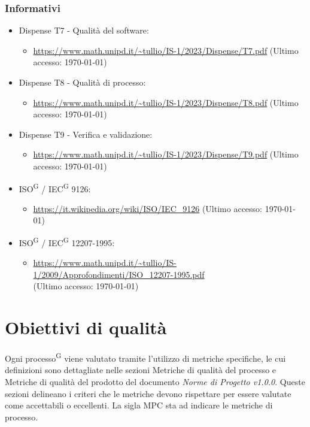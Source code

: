 \documentclass[8pt]{article}
\newcommand{\glossterm}[1]{#1\textsuperscript{G}} %
\begin{document}
\subsubsection{Informativi}
\begin{itemize}
	\item Dispense T7 - Qualità del software:
	\begin{itemize}
		\item \href{https://www.math.unipd.it/~tullio/IS-1/2023/Dispense/T7.pdf}{\color{myblue}https://www.math.unipd.it/\textasciitilde{}tullio/IS-1/2023/Dispense/T7.pdf} (Ultimo accesso: \today)
	\end{itemize}
	\item Dispense T8 - Qualità di processo:
	\begin{itemize}
		\item \href{https://www.math.unipd.it/~tullio/IS-1/2023/Dispense/T8.pdf}{\color{myblue}https://www.math.unipd.it/\textasciitilde{}tullio/IS-1/2023/Dispense/T8.pdf} (Ultimo accesso: \today)
	\end{itemize}
	\item Dispense T9 - Verifica e validazione:
	\begin{itemize}
		\item \href{https://www.math.unipd.it/~tullio/IS-1/2023/Dispense/T9.pdf}{\color{myblue}https://www.math.unipd.it/\textasciitilde{}tullio/IS-1/2023/Dispense/T9.pdf} (Ultimo accesso: \today)
	\end{itemize}
	\item \glossterm{ISO} / \glossterm{IEC} 9126:
	\begin{itemize}
		\item \href{https://it.wikipedia.org/wiki/ISO/IEC_9126}{\color{myblue}https://it.wikipedia.org/wiki/ISO/IEC\_9126} (Ultimo accesso: \today)
	\end{itemize}
	\item \glossterm{ISO} / \glossterm{IEC} 12207-1995:
	\begin{itemize}
		\item \href{https://www.math.unipd.it/~tullio/IS-1/2009/Approfondimenti/ISO_12207-1995.pdf}{\color{myblue}https://www.math.unipd.it/\textasciitilde{}tullio/IS-1/2009/Approfondimenti/ISO\_12207-1995.pdf} \\ (Ultimo accesso: \today)
	\end{itemize}
\end{itemize}
\clearpage
\section{Obiettivi di qualità}\label{sec:obiettivi qualita}
Ogni \glossterm{processo} viene valutato tramite l'utilizzo di metriche specifiche, le cui definizioni sono dettagliate nelle sezioni Metriche di qualità del processo e Metriche di qualità del prodotto del documento \textit{Norme di Progetto v1.0.0}. Queste sezioni delineano i criteri che le metriche devono rispettare per essere valutate come accettabili o eccellenti. La sigla MPC sta ad indicare le metriche di processo.
\end{document}
